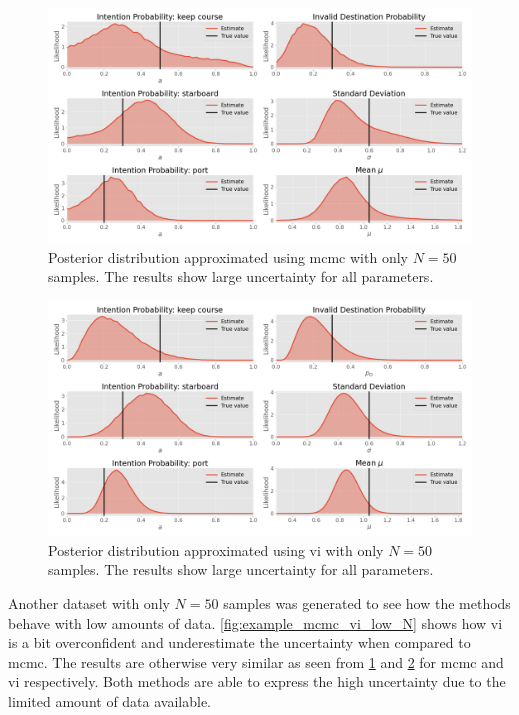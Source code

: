 \begin{figure}[h]
    \centering
    \includegraphics[width=\textwidth]{figures/example_mcmc_low_N.png}
    \caption{Posterior distribution approximated using \acrshort{mcmc} with only $N=50$ samples. The results show large uncertainty for all parameters.}
    \label{fig:example_mcmc_low_N}
\end{figure}

\begin{figure}[h]
    \centering
    \includegraphics[width=\textwidth]{figures/example_vi_low_N.png}
    \caption{Posterior distribution approximated using \acrshort{vi} with only $N=50$ samples. The results show large uncertainty for all parameters.}
    \label{fig:example_vi_low_N}
\end{figure}



Another dataset with only $N=50$ samples was generated to see how the methods behave with low amounts of data. \cref{fig:example_mcmc_vi_low_N} shows how \acrshort{vi} is a bit overconfident and underestimate the uncertainty when compared to \acrshort{mcmc}. The results are otherwise very similar as seen from \cref{fig:example_mcmc_low_N} and \cref{fig:example_vi_low_N} for \acrshort{mcmc} and \acrshort{vi} respectively. Both methods are able to express the high uncertainty due to the limited amount of data available. 

